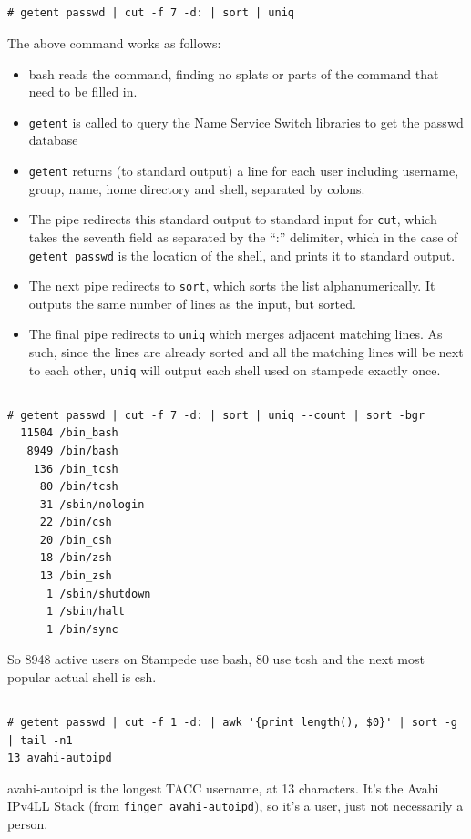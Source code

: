 \documentclass{article}
\begin{document}
\subsection{}
\begin{verbatim}
# getent passwd | cut -f 7 -d: | sort | uniq
\end{verbatim}

The above command works as follows:
\begin{itemize}
\item bash reads the command, finding no splats or parts of the command that need to be filled in.
\item \texttt{getent} is called to query the Name Service Switch libraries to get the passwd database
\item \texttt{getent} returns (to standard output) a line for each user including username, group, name, home directory and shell, separated by colons.
\item The pipe redirects this standard output to standard input for \texttt{cut}, which takes the seventh field as separated by the ``:'' delimiter, which in the case of \texttt{getent passwd} is the location of the shell, and prints it to standard output.
\item The next pipe redirects to \texttt{sort}, which sorts the list alphanumerically. It outputs the same number of lines
as the input, but sorted.
\item The final pipe redirects to \texttt{uniq} which merges adjacent matching lines. As such, since the lines are already
sorted and all the matching lines will be next to each other, \texttt{uniq} will output each shell used on stampede
exactly once.
\end{itemize}


\subsection{}
\begin{verbatim}
# getent passwd | cut -f 7 -d: | sort | uniq --count | sort -bgr
  11504 /bin_bash
   8949 /bin/bash
    136 /bin_tcsh
     80 /bin/tcsh
     31 /sbin/nologin
     22 /bin/csh
     20 /bin_csh
     18 /bin/zsh
     13 /bin_zsh
      1 /sbin/shutdown
      1 /sbin/halt
      1 /bin/sync
\end{verbatim}
So 8948 active users on Stampede use bash, 80 use tcsh and the next most popular actual shell is csh.

\subsection{}
\begin{verbatim}
# getent passwd | cut -f 1 -d: | awk '{print length(), $0}' | sort -g | tail -n1
13 avahi-autoipd
\end{verbatim}
avahi-autoipd is the longest TACC username, at 13 characters. It's the Avahi IPv4LL Stack
(from \texttt{finger avahi-autoipd}), so it's a user, just not necessarily a person. 
\end{document}
